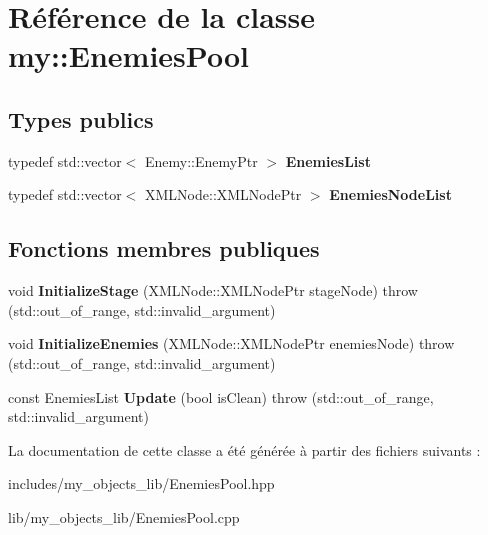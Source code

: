 \hypertarget{classmy_1_1EnemiesPool}{}\section{Référence de la classe my\+:\+:Enemies\+Pool}
\label{classmy_1_1EnemiesPool}
\subsection*{Types publics}
\begin{DoxyCompactItemize}
\item 
\mbox{\label{classmy_1_1EnemiesPool_ae3f32bbf808d2bf78926b3d9833baa0b}} 
typedef std\+::vector$<$ Enemy\+::\+Enemy\+Ptr $>$ {\bfseries Enemies\+List}
\item 
\mbox{\label{classmy_1_1EnemiesPool_a802897ecaf9a2be0342fe0c940d8b87d}} 
typedef std\+::vector$<$ X\+M\+L\+Node\+::\+X\+M\+L\+Node\+Ptr $>$ {\bfseries Enemies\+Node\+List}
\end{DoxyCompactItemize}
\subsection*{Fonctions membres publiques}
\begin{DoxyCompactItemize}
\item 
\mbox{\label{classmy_1_1EnemiesPool_ac19b1fb3fa34c79ecd8a113f56838ef2}} 
void {\bfseries Initialize\+Stage} (X\+M\+L\+Node\+::\+X\+M\+L\+Node\+Ptr stage\+Node)  throw (std\+::out\+\_\+of\+\_\+range, std\+::invalid\+\_\+argument)
\item 
\mbox{\label{classmy_1_1EnemiesPool_a8014f3ffa9485b428ed2cc5b8cc656a6}} 
void {\bfseries Initialize\+Enemies} (X\+M\+L\+Node\+::\+X\+M\+L\+Node\+Ptr enemies\+Node)  throw (std\+::out\+\_\+of\+\_\+range, std\+::invalid\+\_\+argument)
\item 
\mbox{\label{classmy_1_1EnemiesPool_afb428383f257a2e10cc1e6b4cea42a26}} 
const Enemies\+List {\bfseries Update} (bool is\+Clean)  throw (std\+::out\+\_\+of\+\_\+range, std\+::invalid\+\_\+argument)
\end{DoxyCompactItemize}


La documentation de cette classe a été générée à partir des fichiers suivants \+:\begin{DoxyCompactItemize}
\item 
includes/my\+\_\+objects\+\_\+lib/Enemies\+Pool.\+hpp\item 
lib/my\+\_\+objects\+\_\+lib/Enemies\+Pool.\+cpp\end{DoxyCompactItemize}
